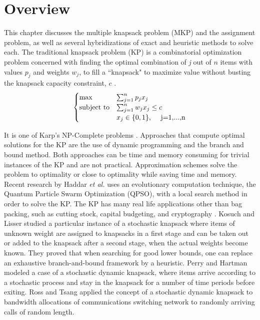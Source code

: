

\section{Overview} 
This chapter discusses the multiple knapsack problem (MKP) and the assignment problem, as well as several hybridizations of exact and heuristic methods to solve each.  The traditional knapsack problem (KP) is a combinatorial optimization problem concerned with finding the optimal combination of \textit{j} out of $n$ items with values $p_j$ and weights $w_j$, to fill a ``knapsack" to maximize value without busting the knapsack capacity constraint, $c$ \cite{knapsackProblems}. 
\begin{align}
\begin{cases}
\max &\sum_{j=1}^n p_jx_j\\
\text{subject to} &\sum_{j=1}^n w_jx_j\leq c\\
&x_j \in \{0,1\} \text{,}	\hspace{5mm}\text{j=1,...,n}
\end{cases}
\end{align}

It is one of Karp's NP-Complete problems \cite{Karp2010ReducibilityProblems}. Approaches that compute optimal solutions for the KP are the use of dynamic programming and the branch and bound method. Both approaches can be time and memory consuming for trivial instances of the KP and are not practical.         
Approximation schemes solve the problem to optimality or close to optimality while saving time and memory.
Recent research by Haddar \textit{et al.} \cite{Haddar2016} uses an evolutionary computation technique, the Quantum Particle Swarm Optimization (QPSO), with a local search method in order to solve the KP. 
The KP has many real life applications other than bag packing, such as cutting stock, capital budgeting, and cryptography \cite{Wilbaut2008}.  Kosuch and Lisser \cite{Kosuch2011OnProblems} studied a particular instance of a stochastic knapsack where items of unknown weight are assigned to knapsacks in a first stage and can be taken out or added to the knapsack after a second stage, when the actual weights become known. They proved that when searching for good lower bounds, one can replace an exhaustive branch-and-bound framework
by a heuristic.  Perry and Hartman \cite{Perry2009} modeled a case of a stochastic dynamic knapsack, where items arrive according to a stochastic process and stay in the knapsack for a number of time periods before exiting. Ross and Tsang \cite{Ross1989} applied the concept of a stochastic dynamic knapsack to bandwidth allocations of communications switching network to randomly arriving calls of random length.        

